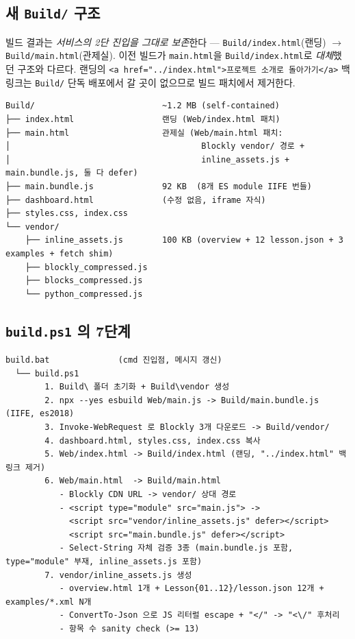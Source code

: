 \documentclass[11pt, oneside]{article}
\begin{document}
\subsection{새 \texttt{Build/} 구조}

빌드 결과는 \emph{서비스의 2단 진입을 그대로 보존}한다 ---
\texttt{Build/index.html}(랜딩) $\to$ \texttt{Build/main.html}(관제실).
이전 빌드가 \texttt{main.html}을 \texttt{Build/index.html}로 \emph{대체}했던
구조와 다르다. 랜딩의 \texttt{<a href="../index.html">프로젝트 소개로
돌아가기</a>} 백링크는 \texttt{Build/} 단독 배포에서 갈 곳이 없으므로
빌드 패치에서 제거한다.

\begin{verbatim}
Build/                          ~1.2 MB (self-contained)
├── index.html                  랜딩 (Web/index.html 패치)
├── main.html                   관제실 (Web/main.html 패치:
│                                       Blockly vendor/ 경로 +
│                                       inline_assets.js + main.bundle.js, 둘 다 defer)
├── main.bundle.js              92 KB  (8개 ES module IIFE 번들)
├── dashboard.html              (수정 없음, iframe 자식)
├── styles.css, index.css
└── vendor/
    ├── inline_assets.js        100 KB (overview + 12 lesson.json + 3 examples + fetch shim)
    ├── blockly_compressed.js
    ├── blocks_compressed.js
    └── python_compressed.js
\end{verbatim}

\subsection{\texttt{build.ps1} 의 7단계}

\begin{verbatim}
build.bat              (cmd 진입점, 메시지 갱신)
  └── build.ps1
        1. Build\ 폴더 초기화 + Build\vendor 생성
        2. npx --yes esbuild Web/main.js -> Build/main.bundle.js  (IIFE, es2018)
        3. Invoke-WebRequest 로 Blockly 3개 다운로드 -> Build/vendor/
        4. dashboard.html, styles.css, index.css 복사
        5. Web/index.html -> Build/index.html (랜딩, "../index.html" 백링크 제거)
        6. Web/main.html  -> Build/main.html
           - Blockly CDN URL -> vendor/ 상대 경로
           - <script type="module" src="main.js"> ->
             <script src="vendor/inline_assets.js" defer></script>
             <script src="main.bundle.js" defer></script>
           - Select-String 자체 검증 3종 (main.bundle.js 포함, type="module" 부재, inline_assets.js 포함)
        7. vendor/inline_assets.js 생성
           - overview.html 1개 + Lesson{01..12}/lesson.json 12개 + examples/*.xml N개
           - ConvertTo-Json 으로 JS 리터럴 escape + "</" -> "<\/" 후처리
           - 항목 수 sanity check (>= 13)
\end{verbatim}
\end{document}
